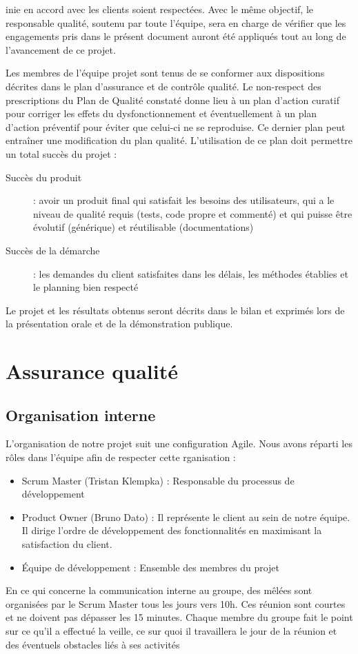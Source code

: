 \documentclass[10pt,a4paper]{article}
\begin{document}
inie en accord avec les clients soient respectées. Avec le même objectif, le responsable qualité, soutenu par toute l’équipe, sera en charge de vérifier que les engagements pris dans le présent document auront été appliqués tout au long de l'avancement de ce projet.

Les membres de l'équipe projet sont tenus de se conformer aux dispositions décrites dans le plan d'assurance et de contrôle qualité. Le non-respect des prescriptions du Plan de Qualité constaté donne lieu à un plan d'action curatif pour corriger les effets du dysfonctionnement et éventuellement à un plan d'action préventif pour éviter que celui-ci ne se reproduise. Ce dernier plan peut entraîner une modification du plan qualité. L’utilisation de ce plan doit permettre un total succès du projet :

\begin{description}
\item [Succès du produit] : avoir un produit final qui satisfait les besoins des utilisateurs, qui a le niveau de qualité requis (tests, code propre et commenté) et qui puisse être évolutif (générique) et réutilisable (documentations)
\item [Succès de la démarche] : les demandes du client satisfaites dans les délais, les méthodes établies et le planning bien respecté
\end{description}

Le projet et les résultats obtenus seront décrits dans le bilan et exprimés lors de la présentation orale et de la démonstration publique. 


\section{Assurance qualité}

\subsection{Organisation interne}


L'organisation de notre projet suit une configuration Agile.
Nous avons réparti les rôles dans l'équipe afin de respecter cette rganisation :
\begin{itemize}
\item Scrum Master (Tristan Klempka) : Responsable du processus de développement
\item Product Owner (Bruno Dato) : Il représente le client au sein de notre équipe. Il dirige l'ordre de développement des fonctionnalités en maximisant la satisfaction du client.
\item Équipe de développement : Ensemble des membres du projet
\end{itemize}
En ce qui concerne la communication interne au groupe, des mêlées sont organisées par le Scrum Master tous les jours vers 10h. Ces réunion sont courtes et ne doivent pas dépasser les 15 minutes. Chaque membre du groupe fait le point sur ce qu'il a effectué la veille, ce sur quoi il travaillera le jour de la réunion et des éventuels obstacles liés à ses activités
\end{document}
